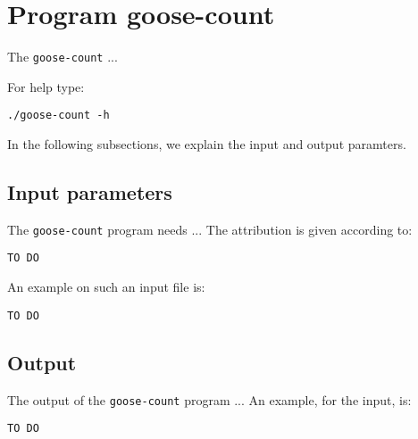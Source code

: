 \section{Program goose-count}
The \texttt{goose-count} ...

For help type:
\begin{lstlisting}
./goose-count -h
\end{lstlisting}
In the following subsections, we explain the input and output paramters.

\subsection{Input parameters}

The \texttt{goose-count} program needs ...
The attribution is given according to:
\begin{lstlisting}
TO DO
\end{lstlisting}

An example on such an input file is:
\begin{lstlisting}
TO DO
\end{lstlisting}

\subsection{Output}
The output of the \texttt{goose-count} program ...
An example, for the input, is:
\begin{lstlisting}
TO DO
\end{lstlisting}
